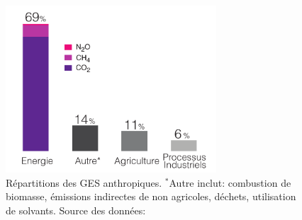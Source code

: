 \begin{figure}[ht]
\centering
\includegraphics[width=0.7\textwidth]{fig/co2_fossil_fuel_these.pdf}
\caption{Répartitions des GES anthropiques. $^{\ast}$Autre inclut: combustion de
biomasse, émissions indirectes de  non agricoles, déchets, utilisation
de solvants. Source des données: \citet{IEA_fossil}}
\label{fig:CO2_Fossil}
\end{figure}
